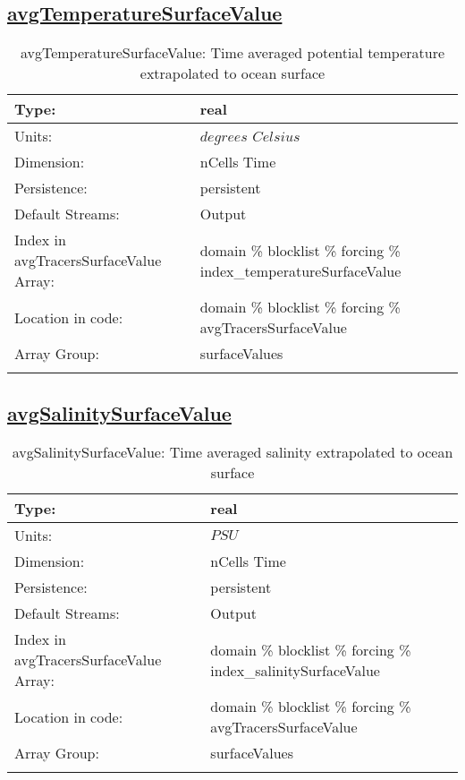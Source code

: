 \subsection[avgTemperatureSurfaceValue]{\hyperref[sec:var_tab_forcing]{avgTemperatureSurfaceValue}}
\label{subsec:var_sec_forcing_avgTemperatureSurfaceValue}
\begin{center}
\begin{longtable}{| p{2.0in} | p{4.0in} |}
        \hline 
        Type: & real \\
        \hline 
        Units: & $degrees$ $Celsius$ \\
        \hline 
        Dimension: & nCells Time \\
        \hline 
        Persistence: & persistent \\
        \hline 
		 Default Streams: & Output  \\
        \hline 
		 Index in avgTracersSurfaceValue Array: & domain \% blocklist \% forcing \% index\_temperatureSurfaceValue \\
		 \hline 
		 Location in code: & domain \% blocklist \% forcing \% avgTracersSurfaceValue \\
		 \hline 
		 Array Group: & surfaceValues \\
		 \hline 
    \caption{avgTemperatureSurfaceValue: Time averaged potential temperature extrapolated to ocean surface}
\end{longtable}
\end{center}
\subsection[avgSalinitySurfaceValue]{\hyperref[sec:var_tab_forcing]{avgSalinitySurfaceValue}}
\label{subsec:var_sec_forcing_avgSalinitySurfaceValue}
\begin{center}
\begin{longtable}{| p{2.0in} | p{4.0in} |}
        \hline 
        Type: & real \\
        \hline 
        Units: & $PSU$ \\
        \hline 
        Dimension: & nCells Time \\
        \hline 
        Persistence: & persistent \\
        \hline 
		 Default Streams: & Output  \\
        \hline 
		 Index in avgTracersSurfaceValue Array: & domain \% blocklist \% forcing \% index\_salinitySurfaceValue \\
		 \hline 
		 Location in code: & domain \% blocklist \% forcing \% avgTracersSurfaceValue \\
		 \hline 
		 Array Group: & surfaceValues \\
		 \hline 
    \caption{avgSalinitySurfaceValue: Time averaged salinity extrapolated to ocean surface}
\end{longtable}
\end{center}
